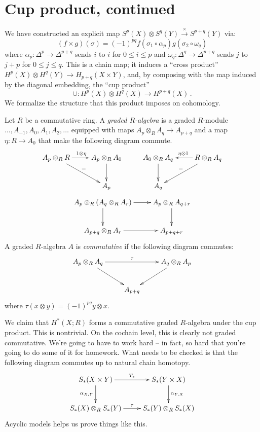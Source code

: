 \section{Cup product, continued}
We have constructed an explicit map $S^p(X)\otimes S^q(Y)\xrightarrow{\times} S^{p+q}(Y)$ via:
\begin{equation*}
(f\times g)(\sigma)=(-1)^{pq}f(\sigma_1\circ\alpha_p)g(\sigma_2\circ\omega_q)
\end{equation*}
where $\alpha_p:\Delta^p\to\Delta^{p+q}$ sends $i$ to $i$ for 
$0\leq i\leq p$ and $\omega_q:\Delta^q\to\Delta^{p+q}$ sends $j$ to $j+p$ 
for  $0\leq j\leq q$. This is a chain map; it induces a ``cross product''
$ H^p(X)\otimes H^q(Y)\to H_{p+q}(X\times Y)$, and, by composing with the
map induced by the diagonal embedding, the ``cup product''
\[
\cup:H^p(X)\otimes H^q(X)\to H^{p+q}(X)\,.
\]
We formalize the structure that this product imposes on cohomology.
\begin{definition}
Let $R$ be a commutative ring. A \emph{graded $R$-algebra} is a graded $R$-module $\ldots,A_{-1},A_0, A_1,A_2,\ldots$ equipped with maps $A_p\otimes_R A_q\to A_{p+q}$ and a map $\eta:R\to A_0$ that make the following diagram commute.
\[
\xymatrix{
A_p\otimes_R R \ar[r]^{1\otimes\eta} \ar[dr]^= &A_p\otimes_R A_0 \ar[d] &
A_0\otimes_R A_q \ar[d] & R\otimes_R A_q \ar[l]_{\eta\otimes1} \ar[dl]_= \\
& A_p & A_q 
}\]
\begin{equation*}
\xymatrix{
A_p\otimes_R (A_q\otimes_R A_r)\ar[r]\ar[d] & A_p\otimes_R A_{q+r}\ar[d]\\
A_{p+q}\otimes_R A_r \ar[r] & A_{p+q+r}
}
\end{equation*}
A graded $R$-algebra $A$ is {\em commutative} if the following diagram commutes:
\begin{equation*}
\xymatrix{
	A_p\otimes_R A_q\ar[rr]^{\tau}\ar[dr] & & A_q\otimes_R A_p \ar[dl]\\
	 & A_{p+q} & 
}
\end{equation*}
where $\tau(x\otimes y)=(-1)^{pq}y\otimes x$. 
\end{definition}
We claim that $ H^\ast(X;R)$ forms a commutative graded $R$-algebra under the cup product. This is nontrivial. On the cochain level, this is clearly not graded commutative. We're going to have to work hard -- in fact, so hard that you're going to do some of it for homework. What needs to be checked is that the following 
diagram commutes up to natural chain homotopy.
\begin{equation*}
\xymatrix{S_\ast(X\times Y)\ar[r]^{T_\ast}\ar[d]_{\alpha_{X,Y}} & S_\ast(Y\times X)\ar[d]^{\alpha_{Y,X}}\\
S_\ast(X)\otimes_R S_\ast(Y)\ar[r]^{\tau} & S_\ast(Y)\otimes_R S_\ast(X)}
\end{equation*}
Acyclic models helps us prove things like this.

